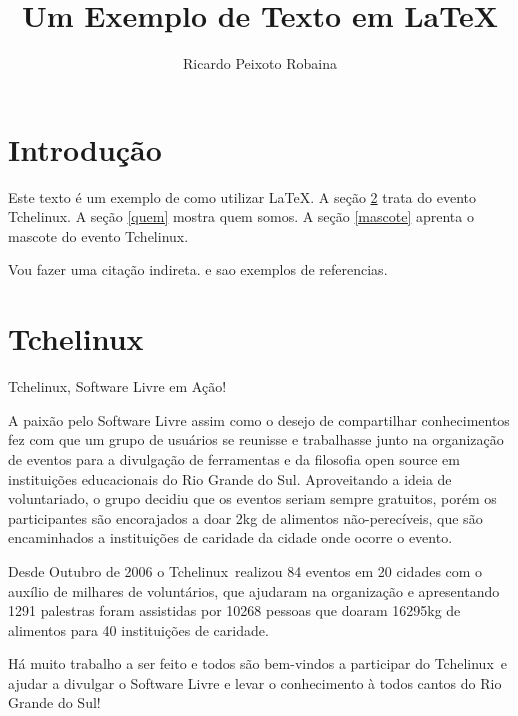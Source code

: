 \documentclass{book}
\title{Um Exemplo de Texto em \LaTeX}
\author{Ricardo Peixoto Robaina}
\newcommand{\tl}{Tchelinux}
\begin{document}
	
	\maketitle
	
	\newpage
	
	\tableofcontents
	
	\newpage
	
	
	\section{Introdução}
	\label{Intro} %
	Este texto é um exemplo de como utilizar \LaTeX. A seção \ref{tchelinux} trata do evento \tl. A seção \ref{quem} mostra quem somos. A seção \ref{mascote} aprenta o mascote do evento \tl.
	
	
	
	
	Vou fazer uma citação indireta. \cite{scrumGuide} e \cite{UnitySite} sao exemplos de referencias.
	
	\section{\tl}
	\label{tchelinux}
	\tl, Software Livre em Ação!
	
	A paixão pelo Software Livre assim como o desejo de compartilhar conhecimentos fez com que um grupo de usuários                      se reunisse e trabalhasse junto na organização de eventos para a divulgação de ferramentas e da filosofia open source em instituições educacionais do Rio Grande do Sul. Aproveitando a ideia de voluntariado, o grupo decidiu que os eventos seriam sempre gratuitos, porém os participantes são encorajados a doar 2kg de alimentos não-perecíveis, que são encaminhados a instituições de caridade da cidade onde ocorre o evento.
	
	Desde Outubro de 2006 o \tl\ realizou 84 eventos em 20 cidades com o auxílio de milhares de voluntários, que ajudaram na organização e apresentando 1291 palestras foram assistidas por 10268 pessoas que doaram 16295kg de alimentos para 40 instituições de caridade. 
	
	Há muito trabalho a ser feito e todos são bem-vindos a participar do \tl\ e ajudar a divulgar o Software Livre e levar o conhecimento à todos cantos do Rio Grande do Sul! 
	
\end{document}
